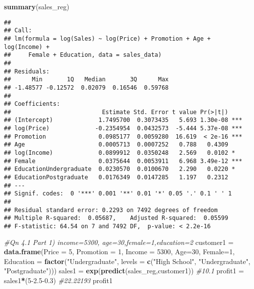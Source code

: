 \documentclass[
]{article}
\newenvironment{Shaded}{\begin{snugshade}}{\end{snugshade}}
\newcommand{\AttributeTok}[1]{\textcolor[rgb]{0.13,0.29,0.53}{#1}}
\newcommand{\CommentTok}[1]{\textcolor[rgb]{0.56,0.35,0.01}{\textit{#1}}}
\newcommand{\DecValTok}[1]{\textcolor[rgb]{0.00,0.00,0.81}{#1}}
\newcommand{\FloatTok}[1]{\textcolor[rgb]{0.00,0.00,0.81}{#1}}
\newcommand{\FunctionTok}[1]{\textcolor[rgb]{0.13,0.29,0.53}{\textbf{#1}}}
\newcommand{\NormalTok}[1]{#1}
\newcommand{\OtherTok}[1]{\textcolor[rgb]{0.56,0.35,0.01}{#1}}
\newcommand{\SpecialCharTok}[1]{\textcolor[rgb]{0.81,0.36,0.00}{\textbf{#1}}}
\newcommand{\StringTok}[1]{\textcolor[rgb]{0.31,0.60,0.02}{#1}}
\begin{document}
\begin{Shaded}
\begin{Highlighting}[]
\FunctionTok{summary}\NormalTok{(sales\_reg)}
\end{Highlighting}
\end{Shaded}

\begin{verbatim}
## 
## Call:
## lm(formula = log(Sales) ~ log(Price) + Promotion + Age + log(Income) + 
##     Female + Education, data = sales_data)
## 
## Residuals:
##      Min       1Q   Median       3Q      Max 
## -1.48577 -0.12572  0.02079  0.16546  0.59768 
## 
## Coefficients:
##                          Estimate Std. Error t value Pr(>|t|)    
## (Intercept)             1.7495700  0.3073435   5.693 1.30e-08 ***
## log(Price)             -0.2354954  0.0432573  -5.444 5.37e-08 ***
## Promotion               0.0985177  0.0059280  16.619  < 2e-16 ***
## Age                     0.0005713  0.0007252   0.788   0.4309    
## log(Income)             0.0899912  0.0350248   2.569   0.0102 *  
## Female                  0.0375644  0.0053911   6.968 3.49e-12 ***
## EducationUndergraduate  0.0230570  0.0100670   2.290   0.0220 *  
## EducationPostgraduate   0.0176349  0.0147285   1.197   0.2312    
## ---
## Signif. codes:  0 '***' 0.001 '**' 0.01 '*' 0.05 '.' 0.1 ' ' 1
## 
## Residual standard error: 0.2293 on 7492 degrees of freedom
## Multiple R-squared:  0.05687,    Adjusted R-squared:  0.05599 
## F-statistic: 64.54 on 7 and 7492 DF,  p-value: < 2.2e-16
\end{verbatim}

\begin{Shaded}
\begin{Highlighting}[]
\CommentTok{\#Qn 4.1 Part 1) income=5300, age=30,female=1,education=2}
\NormalTok{customer1 }\OtherTok{=} \FunctionTok{data.frame}\NormalTok{(}\AttributeTok{Price =} \DecValTok{5}\NormalTok{, }\AttributeTok{Promotion =} \DecValTok{1}\NormalTok{, }\AttributeTok{Income =} \DecValTok{5300}\NormalTok{, }\AttributeTok{Age=}\DecValTok{30}\NormalTok{, }\AttributeTok{Female=}\DecValTok{1}\NormalTok{, }\AttributeTok{Education =} \FunctionTok{factor}\NormalTok{(}\StringTok{"Undergraduate"}\NormalTok{, }\AttributeTok{levels =} \FunctionTok{c}\NormalTok{(}\StringTok{"High School"}\NormalTok{, }\StringTok{"Undergraduate"}\NormalTok{, }\StringTok{"Postgraduate"}\NormalTok{)))}
\NormalTok{sales1 }\OtherTok{=} \FunctionTok{exp}\NormalTok{(}\FunctionTok{predict}\NormalTok{(sales\_reg,customer1)) }\CommentTok{\#10.1}
\NormalTok{profit1 }\OtherTok{=}\NormalTok{ sales1}\SpecialCharTok{*}\NormalTok{(}\DecValTok{5}\FloatTok{{-}2.5{-}0.3}\NormalTok{) }\CommentTok{\#22.22193}
\NormalTok{profit1}
\end{Highlighting}
\end{Shaded}
\end{document}
